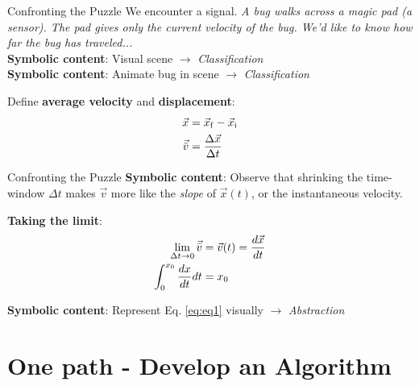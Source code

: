 \documentclass{beamer}
\begin{document}
\begin{frame}{Confronting the Puzzle}
We encounter a \alert{signal}.  \textit{A bug walks across a magic pad (a sensor).  The pad gives only the current velocity of the bug.  We'd like to know how far the bug has traveled...} \\ 
\alert{\textbf{Symbolic content}}: Visual scene $\to$ \textit{\alert{Classification}} \\
\alert{\textbf{Symbolic content}}: Animate bug in scene $\to$ \textit{\alert{Classification}} \vspace{0.25cm}
\begin{tcolorbox}
Define \textbf{average velocity} and \textbf{displacement}: \\
\begin{align}
\vec{x} &= \vec{x}_{\rm f} - \vec{x}_{\rm i} \\
\vec{\bar{v}} &= \frac{\Delta \vec{x}}{\Delta t}
\end{align}
\end{tcolorbox}
\end{frame}

\begin{frame}{Confronting the Puzzle}
\alert{\textbf{Symbolic content}}: Observe that shrinking the time-window $\Delta t$ makes $\vec{v}$ more like the \textit{slope} of $\vec{x}(t)$, or the instantaneous velocity. \\ \vspace{0.5cm}
\begin{tcolorbox}
\textbf{Taking the limit}:
\begin{align} 
\lim_{\Delta t \to 0} \vec{\bar{v}} &= \vec{v}(t) = \frac{d\vec{x}}{dt} \\
\int_{0}^{x_{\rm 0}} \frac{dx}{dt} dt &= x_{\rm 0} \label{eq:eq1}
\end{align}
\end{tcolorbox}
\vspace{0.5cm}
\alert{\textbf{Symbolic content}}: Represent Eq. \ref{eq:eq1} visually $\to$ \textit{\alert{Abstraction}}
\end{frame}

\section{One path - Develop an Algorithm}
\end{document}
